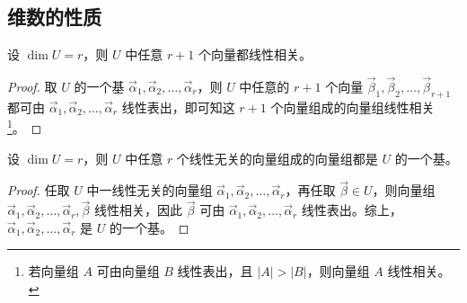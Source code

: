 \subsection{维数的性质}

\begin{theorem}
	设 $\dim U = r$，则 $U$ 中任意 $r + 1$ 个向量都线性相关。
\end{theorem}

\begin{proof}
	取 $U$ 的一个基 $\vec \alpha_1, \vec \alpha_2, \ldots, \vec \alpha_r$，则 $U$ 中任意的 $r + 1$ 个向量 $\vec \beta_1, \vec \beta_2, \ldots, \vec \beta_{r + 1}$ 都可由 $\vec \alpha_1, \vec \alpha_2, \ldots, \vec \alpha_r$ 线性表出，即可知这 $r + 1$ 个向量组成的向量组线性相关\footnote{若向量组 $A$ 可由向量组 $B$ 线性表出，且 $|A| > |B|$，则向量组 $A$ 线性相关。}。
\end{proof}

\begin{theorem}
	设 $\dim U = r$，则 $U$ 中任意 $r$ 个线性无关的向量组成的向量组都是 $U$ 的一个基。
\end{theorem}

\begin{proof}
	任取 $U$ 中一线性无关的向量组 $\vec \alpha_1, \vec \alpha_2, \ldots, \vec \alpha_r$，再任取 $\vec \beta \in U$，则向量组 $\vec \alpha_1, \vec \alpha_2, \ldots, \vec \alpha_r, \vec \beta$ 线性相关，因此 $\vec \beta$ 可由 $\vec \alpha_1, \vec \alpha_2, \ldots, \vec \alpha_r$ 线性表出。综上， $\vec \alpha_1, \vec \alpha_2, \ldots, \vec \alpha_r$ 是 $U$ 的一个基。
\end{proof}